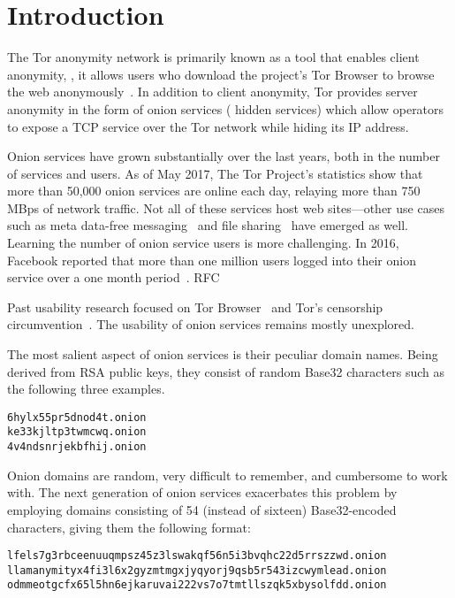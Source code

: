 \section{Introduction}
\label{sec:introduction}
The Tor anonymity network is primarily known as a tool that enables client
anonymity, \ie, it allows users who download the project's Tor Browser to
browse the web anonymously~\cite{Dingledine2004a}.  In addition to client
anonymity, Tor provides server anonymity in the form of onion services (\aka
hidden services) which allow operators to expose a TCP service over the Tor
network while hiding its IP address.

Onion services have grown substantially over the last years, both in the number
of services and users.  As of May 2017, The Tor Project's statistics show that
more than 50,000 onion services are online each day, relaying more than 750 MBps
of network traffic.  Not all of these services host web sites---other use cases
such as meta data-free messaging~\cite{ricochet} and file
sharing~\cite{onionshare} have emerged as well.  Learning the number of onion
service users is more challenging.  In 2016, Facebook reported that more than
one million users logged into their onion service over a one month
period~\cite{facebook-users}.
RFC~\cite{rfc7686}

Past usability research focused on Tor Browser~\cite{Clark2007a,Norcie2014a}
and Tor's censorship circumvention~\cite{Fifield2015a}.  The usability of onion
services remains mostly unexplored.

The most salient aspect of onion services is their peculiar domain names.
Being derived from RSA public keys, they consist of random Base32 characters
such as the following three examples.

{\footnotesize
\begin{verbatim}
6hylx55pr5dnod4t.onion
ke33kjltp3twmcwq.onion
4v4ndsnrjekbfhij.onion
\end{verbatim}
}

Onion domains are random, very difficult to remember, and cumbersome to work
with.  The next generation of onion services exacerbates this problem by
employing domains consisting of 54 (instead of sixteen) Base32-encoded
characters, giving them the following format:

{\footnotesize
\begin{verbatim}
lfels7g3rbceenuuqmpsz45z3lswakqf56n5i3bvqhc22d5rrszzwd.onion
llamanymityx4fi3l6x2gyzmtmgxjyqyorj9qsb5r543izcwymlead.onion
odmmeotgcfx65l5hn6ejkaruvai222vs7o7tmtllszqk5xbysolfdd.onion
\end{verbatim}
}

